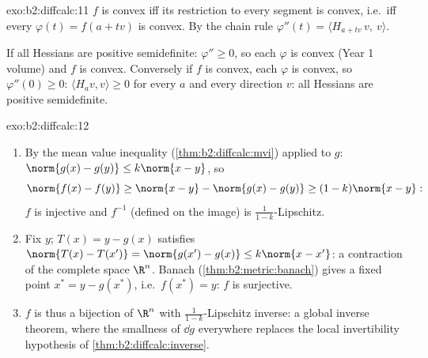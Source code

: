 \begin{solution}{exo:b2:diffcalc:11}
$f$ is convex iff its restriction to every segment is convex,
i.e.\ iff every $\varphi(t) = f(a + tv)$ is convex. By the chain
rule $\varphi''(t) = \langle H_{a+tv}\,v,\ v\rangle$.

If all Hessians are positive semidefinite: $\varphi'' \geq 0$,
so each $\varphi$ is convex (Year 1 volume) and $f$ is convex.
Conversely if $f$ is convex, each $\varphi$ is convex, so
$\varphi''(0) \geq 0$: $\langle H_a v, v\rangle \geq 0$ for
every $a$ and every direction $v$: all Hessians are positive
semidefinite.
\end{solution}

\begin{solution}{exo:b2:diffcalc:12}
\begin{enumerate}
  \item By the mean value inequality
        (\cref{thm:b2:diffcalc:mvi}) applied to $g$:
        $\norm{g(x) - g(y)} \leq k\norm{x-y}$, so
        \[
        \norm{f(x) - f(y)} \geq \norm{x - y} - \norm{g(x) -
        g(y)} \geq (1 - k)\norm{x - y} :
        \]
        $f$ is injective and $f^{-1}$ (defined on the image) is
        $\frac{1}{1-k}$-Lipschitz.
  \item Fix $y$; $T(x) = y - g(x)$ satisfies $\norm{T(x) -
        T(x')} = \norm{g(x') - g(x)} \leq k\norm{x - x'}$: a
        contraction of the complete space $\R^n$. Banach
        (\cref{thm:b2:metric:banach}) gives a fixed point $x^*
        = y - g(x^*)$, i.e.\ $f(x^*) = y$: $f$ is surjective.
  \item $f$ is thus a bijection of $\R^n$ with
        $\frac{1}{1-k}$-Lipschitz inverse: a global inverse
        theorem, where the smallness of $\dd g$ everywhere
        replaces the local invertibility hypothesis of
        \cref{thm:b2:diffcalc:inverse}.
\end{enumerate}
\end{solution}


